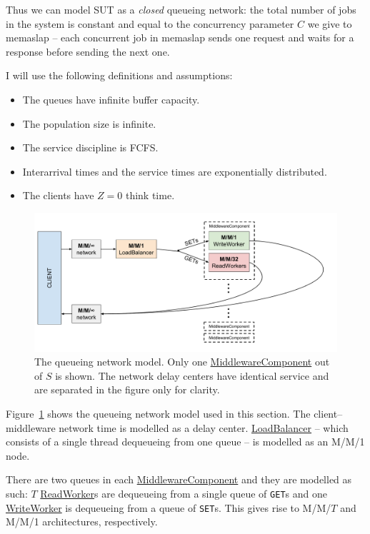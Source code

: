 \documentclass[11pt]{article}
\newcommand{\get}[0]{\texttt{GET}}
\newcommand{\set}[0]{\texttt{SET}}
\newcommand{\linkmain}[1]{\href{https://gitlab.inf.ethz.ch/pungast/asl-fall16-project/blob/master/src/main/java/asl/#1.java}{#1}}
\begin{document}
Thus we can model SUT as a \emph{closed} queueing network: the total number of jobs in the system is constant and equal to the concurrency parameter $C$ we give to memaslap -- each concurrent job in memaslap sends one request and waits for a response before sending the next one.

I will use the following definitions and assumptions:
\begin{itemize}
	\item The queues have infinite buffer capacity.
	\item The population size is infinite.
	\item The service discipline is FCFS.
	\item Interarrival times and the service times are exponentially distributed.
	\item The clients have $Z=0$ think time.
\end{itemize}

\begin{figure}[h]
\centering
\includegraphics[width=\textwidth]{figures/queueing_network}
\caption{The queueing network model. Only one \linkmain{MiddlewareComponent} out of $S$ is shown. The network delay centers have identical service and are separated in the figure only for clarity.}
\label{fig:part3:network_diagram}
\end{figure}

Figure~\ref{fig:part3:network_diagram} shows the queueing network model used in this section. The client--middleware network time is modelled as a delay center. \linkmain{LoadBalancer} -- which consists of a single thread dequeueing from one queue -- is modelled as an M/M/1 node.

There are two queues in each \linkmain{MiddlewareComponent} and they are modelled as such: $T$ \linkmain{ReadWorker}s are dequeueing from a single queue of \get{}s and one \linkmain{WriteWorker} is dequeueing from a queue of \set{}s. This gives rise to M/M/$T$ and M/M/1 architectures, respectively.
\end{document}
